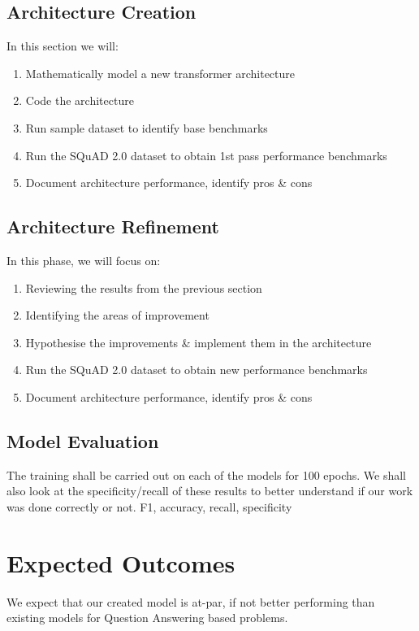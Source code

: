 \documentclass[11pt]{article}
\begin{document}
\subsection{Architecture Creation}\label{architecturecreation}
In this section we will:

\begin{enumerate}
    \item{Mathematically model a new transformer architecture}
    \item{Code the architecture}
    \item{Run sample dataset to identify base benchmarks}
    \item{Run the SQuAD 2.0 dataset\cite{dataset} to obtain 1st pass performance benchmarks}
    \item{Document architecture performance, identify pros \& cons}
\end{enumerate}
\subsection{Architecture Refinement}\label{refinement}
In this phase, we will focus on:
\begin{enumerate}
    \item{Reviewing the results from the previous section}
    \item{Identifying the areas of improvement}
    \item{Hypothesise the improvements \& implement them in the architecture}
    \item{Run the SQuAD 2.0 dataset\cite{dataset} to obtain new performance benchmarks}
    \item{Document architecture performance, identify pros \& cons}
\end{enumerate}
\subsection{Model Evaluation}
 The training shall be carried out on each of the models for 100 epochs. We shall also look at the specificity/recall of these results to better understand if our work was done correctly or not. F1, accuracy, recall, specificity
\section{Expected Outcomes}\label{expectedoutcomes}

We expect that our created model is at-par, if not better performing than existing models for Question Answering based problems.
\end{document}
